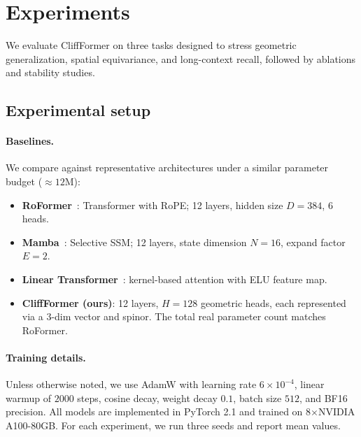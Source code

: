 \documentclass{article}
\theoremstyle{plain}
\theoremstyle{definition}
\theoremstyle{remark}
\begin{document}
\section{Experiments}
\label{sec:experiments}

We evaluate CliffFormer on three tasks designed to stress geometric generalization, spatial equivariance, and long-context recall, followed by ablations and stability studies.

\subsection{Experimental setup}
\label{sec:exp_setup}

\paragraph{Baselines.}
We compare against representative architectures under a similar parameter budget ($\approx 12$M):

\begin{itemize}
    \item \textbf{RoFormer}~\cite{su2024roformer}: Transformer with RoPE; 12 layers, hidden size $D=384$, 6 heads.
    \item \textbf{Mamba}~\cite{gu2024mamba}: Selective SSM; 12 layers, state dimension $N=16$, expand factor $E=2$.
    \item \textbf{Linear Transformer}~\cite{katharopoulos2020transformers}: kernel-based attention with ELU feature map.
    \item \textbf{CliffFormer (ours)}: 12 layers, $H=128$ geometric heads, each represented via a $3$-dim vector and spinor. The total real parameter count matches RoFormer.
\end{itemize}

\paragraph{Training details.}
Unless otherwise noted, we use AdamW with learning rate $6\times 10^{-4}$, linear warmup of $2000$ steps, cosine decay, weight decay $0.1$, batch size $512$, and BF16 precision. All models are implemented in PyTorch 2.1 and trained on 8$\times$NVIDIA A100-80GB. For each experiment, we run three seeds and report mean values.
\end{document}
